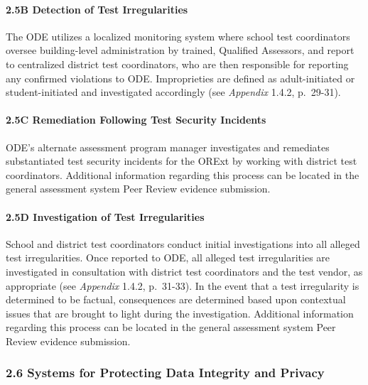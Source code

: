 \documentclass[]{article}
\let\oldparagraph\paragraph
\renewcommand{\paragraph}[1]{\oldparagraph{#1}\mbox{}}
\begin{document}
\paragraph{2.5B Detection of Test
Irregularities}\label{b-detection-of-test-irregularities}

The ODE utilizes a localized monitoring system where school test
coordinators oversee building-level administration by trained, Qualified
Assessors, and report to centralized district test coordinators, who are
then responsible for reporting any confirmed violations to ODE.
Improprieties are defined as adult-initiated or student-initiated and
investigated accordingly (see \emph{Appendix} 1.4.2, p.~29-31).

\paragraph{2.5C Remediation Following Test Security
Incidents}\label{c-remediation-following-test-security-incidents}

ODE's alternate assessment program manager investigates and remediates
substantiated test security incidents for the ORExt by working with
district test coordinators. Additional information regarding this
process can be located in the general assessment system Peer Review
evidence submission.

\paragraph{2.5D Investigation of Test
Irregularities}\label{d-investigation-of-test-irregularities}

School and district test coordinators conduct initial investigations
into all alleged test irregularities. Once reported to ODE, all alleged
test irregularities are investigated in consultation with district test
coordinators and the test vendor, as appropriate (see \emph{Appendix}
1.4.2, p.~31-33). In the event that a test irregularity is determined to
be factual, consequences are determined based upon contextual issues
that are brought to light during the investigation. Additional
information regarding this process can be located in the general
assessment system Peer Review evidence submission.

\subsubsection{2.6 Systems for Protecting Data Integrity and
Privacy}\label{systems-for-protecting-data-integrity-and-privacy}
\end{document}
